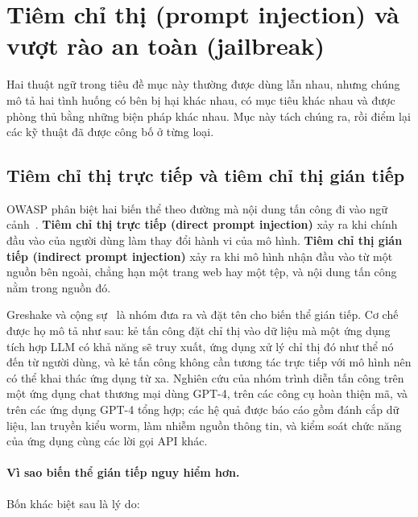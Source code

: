 
\section{Tiêm chỉ thị (prompt injection) và vượt rào an toàn (jailbreak)}
\label{sec:prompt_injection_jailbreak}

Hai thuật ngữ trong tiêu đề mục này thường được dùng lẫn nhau, nhưng chúng mô tả hai tình huống có bên bị hại khác nhau, có mục tiêu khác nhau và được phòng thủ bằng những biện pháp khác nhau. Mục này tách chúng ra, rồi điểm lại các kỹ thuật đã được công bố ở từng loại.

\subsection{Tiêm chỉ thị trực tiếp và tiêm chỉ thị gián tiếp}
\label{ssec:direct_vs_indirect_injection}

OWASP phân biệt hai biến thể theo đường mà nội dung tấn công đi vào ngữ cảnh~\cite{owasp2025llmtop10}. \textbf{Tiêm chỉ thị trực tiếp (direct prompt injection)} xảy ra khi chính đầu vào của người dùng làm thay đổi hành vi của mô hình. \textbf{Tiêm chỉ thị gián tiếp (indirect prompt injection)} xảy ra khi mô hình nhận đầu vào từ một nguồn bên ngoài, chẳng hạn một trang web hay một tệp, và nội dung tấn công nằm trong nguồn đó.

Greshake và cộng sự~\cite{greshake2023indirect} là nhóm đưa ra và đặt tên cho biến thể gián tiếp. Cơ chế được họ mô tả như sau: kẻ tấn công đặt chỉ thị vào dữ liệu mà một ứng dụng tích hợp LLM có khả năng sẽ truy xuất, ứng dụng xử lý chỉ thị đó như thể nó đến từ người dùng, và kẻ tấn công không cần tương tác trực tiếp với mô hình nên có thể khai thác ứng dụng từ xa. Nghiên cứu của nhóm trình diễn tấn công trên một ứng dụng chat thương mại dùng GPT-4, trên các công cụ hoàn thiện mã, và trên các ứng dụng GPT-4 tổng hợp; các hệ quả được báo cáo gồm đánh cắp dữ liệu, lan truyền kiểu worm, làm nhiễm nguồn thông tin, và kiểm soát chức năng của ứng dụng cùng các lời gọi API khác.

\paragraph{Vì sao biến thể gián tiếp nguy hiểm hơn.} Bốn khác biệt sau là lý do:

